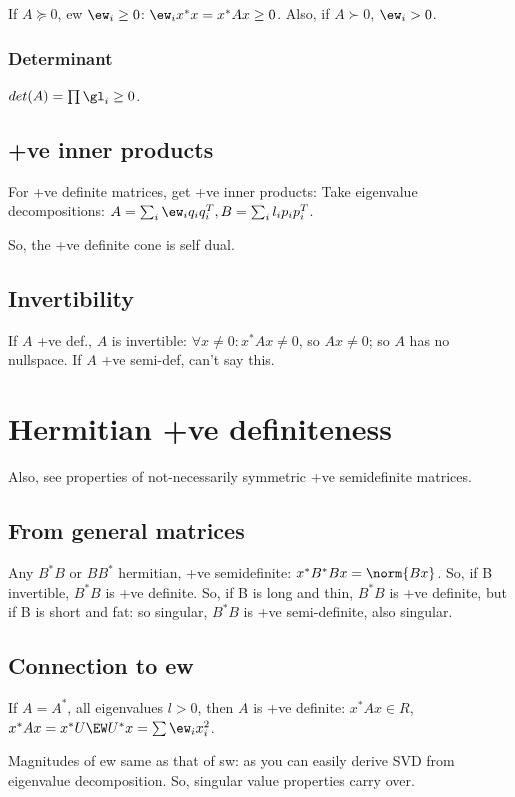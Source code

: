 \documentclass[oneside, article]{memoir}
\begin{document}
If $A \succeq 0$, ew $\ew_i \geq 0$: $\ew_i x^{*}x = x^{*}Ax \geq 0$. Also, if $A \succ 0$, $\ew_i > 0$.

\subsubsection{Determinant}
$det(A) = \prod \gl_i \geq 0$.

\subsection{+ve inner products}
For +ve definite matrices, get +ve inner products: Take eigenvalue decompositions: $A = \sum_i \ew_i q_i q_i^{T}, B = \sum_i l_i p_i p_i^{T}$.

So, the +ve definite cone is self dual.

\subsection{Invertibility}
If $A$ +ve def., $A$ is invertible: $\forall x\neq 0: x^{*}Ax \neq 0$, so $Ax \neq 0$; so $A$ has no nullspace. If $A$ +ve semi-def, can't say this.

\section{Hermitian +ve definiteness}
Also, see properties of not-necessarily symmetric +ve semidefinite matrices.

\subsection{From general matrices}
Any $B^{*}B$ or $BB^{*}$ hermitian, +ve semidefinite: $x^{*}B^{*}Bx = \norm{Bx}$. So, if B invertible, $B^{*}B$ is +ve definite. So, if B is long and thin, $B^{*}B$ is +ve definite, but if B is short and fat: so singular, $B^{*}B$ is +ve semi-definite, also singular.

\subsection{Connection to ew}
If $A = A^{*}$, all eigenvalues $l>0$, then $A$ is +ve definite: $x^{*}Ax \in R$, $x^{*}Ax = x^{*}U\EW U^{*}x = \sum \ew_{i}x_{i}^{2}$.

Magnitudes of ew same as that of sw: as you can easily derive SVD from eigenvalue decomposition. So, singular value properties carry over.
\end{document}
